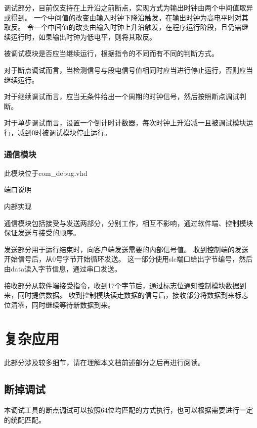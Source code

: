                 调试部分，目前仅支持在上升沿之前断点，实现方式为输出时钟由两个中间值取异或得到。
                一个中间值的改变由输入时钟下降沿触发，在输出时钟为高电平时对其取反。
                令一个中间值的改变由输入时钟上升沿触发，在程序运行阶段，且仍需继续运行时，如果输出时钟为低电平，则将其取反。

                被调试模块是否应当继续运行，根据指令的不同而有不同的判断方式。

                对于断点调试而言，当检测信号与段电信号值相同时应当进行停止运行，否则应当继续运行。

                对于继续调试而言，应当无条件给出一个周期的时钟信号，然后按照断点调试判断。

                对于单步调试而言，设置一个倒计时计数器，每次时钟上升沿减一且被调试模块运行，减到0时被调试模块停止运行。

        \subsubsection{通信模块}
            此模块位于com\_debug.vhd

            端口说明

                
            内部实现

                通信模块包括接受与发送两部分，分别工作，相互不影响，通过软件端、控制模块保证发送与接受的顺序。

                发送部分用于运行结束时，向客户端发送需要的内部信号值。%
                收到控制端的发送开始信号后，从0号字节开始循环发送。%
                这一部分使用slc端口给出字节编号，然后由data读入字节信息，通过串口发送。

                接收部分从软件端接受指令，收到17个字节后，通过标志位通知控制模块数据到来，同时提供数据。%
                收到控制模块读走数据的信号后，接收部分将数据到来标志位清零，同时继续等待新数据到来。

\section{复杂应用}
    此部分涉及较多细节，请在理解本文档前述部分之后再进行阅读。
    \subsection{断掉调试}
        本调试工具的断点调试可以按照64位均匹配的方式执行，也可以根据需要进行一定的统配匹配。

